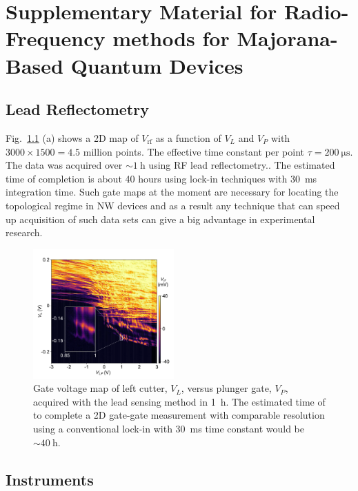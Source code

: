 \chapter{Supplementary Material for Radio-Frequency methods for Majorana-Based Quantum Devices}


\section{Lead Reflectometry}
\label{sec:majo_A}
Fig.~\ref{fig:majo_f} (a) shows a 2D map of $V_\textrm{rf}$ as a function of $V_{L}$ and $V_{P}$ with $3000 \times 1500 = 4.5$ million points. The effective time constant per point $\tau= \SI{200}{\micro\second}$. The data was acquired over $\sim \SI{1}{\hour}$ using RF lead reflectometry.. The estimated time of completion is about 40 hours using lock-in techniques with \SI{30}{\milli\second} integration time. Such gate maps at the moment are necessary for locating the topological regime in NW devices and as a result any technique that can speed up acquisition of such data sets can give a big advantage in experimental research.

\begin{figure}
    \includegraphics[width=0.48\textwidth]{Fig6-2.pdf}
      \caption[Fast high-resolution charge sensing]{Gate voltage map of left cutter, $V_{L}$, versus plunger gate, $V_{P}$, acquired with the lead sensing method in \SI{1}{\hour}. The estimated time of to complete a 2D gate-gate measurement with comparable resolution using a conventional lock-in with \SI{30}{\milli\second} time constant would be $\sim \SI{40}{\hour}$.}
      \label{fig:majo_f}
\end{figure}

\section{Instruments}
\label{sec:majo_B}

